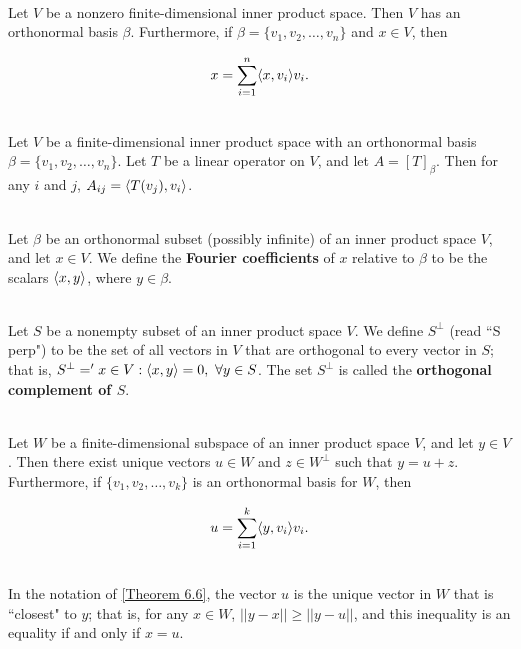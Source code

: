 \begin{theorem}
	\hfill\\
	Let $V$ be a nonzero finite-dimensional inner product space. Then $V$ has an orthonormal basis $\beta$. Furthermore, if $\beta = \{v_1, v_2, \dots, v_n\}$ and $x \in V$, then

	\[x = \sum_{i=1}^{n}\langle x,v_i\rangle v_i.\]
\end{theorem}

\begin{corollary}
	\hfill\\
	Let $V$ be a finite-dimensional inner product space with an orthonormal basis $\beta = \{v_1, v_2, \dots, v_n\}$. Let $T$ be a linear operator on $V$, and let $A = [T]_\beta$. Then for any $i$ and $j$, $A_{ij} = \langle T(v_j),v_i\rangle$.
\end{corollary}

\begin{definition}
	\hfill\\
	Let $\beta$ be an orthonormal subset (possibly infinite) of an inner product space $V$, and let $x \in V$. We define the \textbf{Fourier coefficients} of $x$ relative to $\beta$ to be the scalars $\langle x,y\rangle$, where $y \in \beta$.
\end{definition}

\begin{definition}
	\hfill\\
	Let $S$ be a nonempty subset of an inner product space $V$. We define $S^\perp$ (read ``S perp") to be the set of all vectors in $V$ that are orthogonal to every vector in $S$; that is, $S^\perp = '{x \in V : \lr{x,y} = 0,\ \forall y \in S}$. The set $S^\perp$ is called the \textbf{orthogonal complement of $S$}.
\end{definition}

\begin{theorem}\label{Theorem 6.6}
	\hfill\\
	Let $W$ be a finite-dimensional subspace of an inner product space $V$, and let $y \in V$. Then there exist unique vectors $u \in W$ and $z \in W^\perp$ such that $y = u + z$. Furthermore, if $\{v_1, v_2, \dots, v_k\}$ is an orthonormal basis for $W$, then

	\[u = \sum_{i=1}^{k}\langle y,v_i\rangle v_i.\]
\end{theorem}

\begin{corollary}
	\hfill\\
	In the notation of \autoref{Theorem 6.6}, the vector $u$ is the unique vector in $W$ that is ``closest" to $y$; that is, for any $x \in W$, $||y - x|| \geq ||y - u||$, and this inequality is an equality if and only if $x = u$.
\end{corollary}

